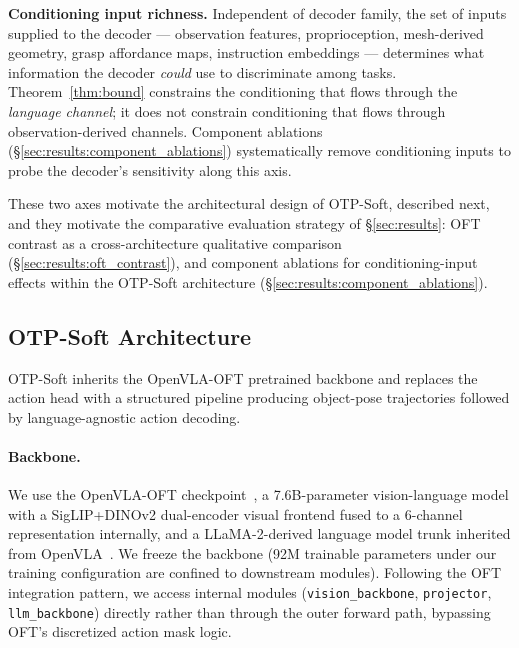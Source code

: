 \textbf{Conditioning input richness.} Independent of decoder family, the set of inputs
supplied to the decoder --- observation features, proprioception, mesh-derived geometry,
grasp affordance maps, instruction embeddings --- determines what information the decoder
\emph{could} use to discriminate among tasks. Theorem~\ref{thm:bound} constrains the
conditioning that flows through the \emph{language channel}; it does not constrain
conditioning that flows through observation-derived channels. Component ablations
(\S\ref{sec:results:component_ablations}) systematically remove conditioning inputs to
probe the decoder's sensitivity along this axis.

These two axes motivate the architectural design of OTP-Soft, described next, and they
motivate the comparative evaluation strategy of \S\ref{sec:results}: OFT contrast as a
cross-architecture qualitative comparison (\S\ref{sec:results:oft_contrast}), and component
ablations for conditioning-input effects within the OTP-Soft architecture
(\S\ref{sec:results:component_ablations}).

\subsection{OTP-Soft Architecture}
\label{sec:architecture:otp_soft}

OTP-Soft inherits the OpenVLA-OFT pretrained backbone and replaces the action head with a
structured pipeline producing object-pose trajectories followed by language-agnostic action
decoding.

\paragraph{Backbone.}
We use the OpenVLA-OFT checkpoint~\cite{kim2025openvla_oft}, a 7.6B-parameter
vision-language model with a SigLIP+DINOv2 dual-encoder visual frontend fused to a
6-channel representation internally, and a LLaMA-2-derived language model trunk inherited
from OpenVLA~\cite{kim2024openvla}. We freeze the backbone (92M trainable parameters under
our training configuration are confined to downstream modules). Following the OFT
integration pattern, we access internal modules (\texttt{vision\_backbone},
\texttt{projector}, \texttt{llm\_backbone}) directly rather than through the outer forward
path, bypassing OFT's discretized action mask logic.

